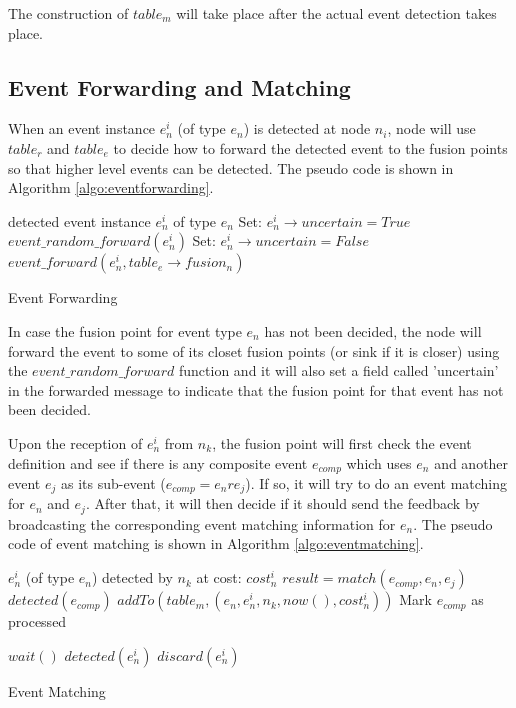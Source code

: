 The construction of \(table_m\) will take place after the actual event detection takes place. 

\subsection{Event Forwarding and Matching}
When an event instance \(e_n^i\) (of type \(e_n\)) is detected at node \(n_i\), node will use \(table_r\) and \(table_e\) to decide how to forward the detected event to the fusion points so that higher level events can be detected. The pseudo code is shown in Algorithm \ref{algo:eventforwarding}.

\begin{algorithm}
\begin{algorithmic}
\REQUIRE detected event instance \(e_n^i\) of type \(e_n\)
		\STATE Set: \(e_n^i\rightarrow uncertain=True\)
		\STATE \(event\_random\_forward(e_n^i)\)
	\ELSE
		\STATE Set: \(e_n^i\rightarrow uncertain=False\)
		\STATE \(event\_forward(e_n^i, table_e\rightarrow fusion_n)\)
	\ENDIF
\end{algorithmic}
\caption{Event Forwarding}
\label{algo:eventforwarding}
\end{algorithm}

In case the fusion point for event type \(e_n\) has not been decided, the node will forward the event to some of its closet fusion points (or sink if it is closer) using the \(event\_random\_forward\) function and it will also set a field called 'uncertain' in the forwarded message to indicate that the fusion point for that event has not been decided.

Upon the reception of \(e_n^i\) from \(n_k\), the fusion point will first check the event definition and see if there is any composite event \(e_{comp}\) which uses \(e_n\) and another event \(e_j\) as its sub-event (\(e_{comp}=e_nre_j\)). If so, it will try to do an event matching for \(e_n\) and \(e_j\). After that, it will then decide if it should send the feedback by broadcasting the corresponding event matching information for \(e_n\). The pseudo code of event matching is shown in Algorithm \ref{algo:eventmatching}.

\begin{algorithm}
\begin{algorithmic}
\REQUIRE \(e_n^i\) (of type \(e_n\)) detected by \(n_k\) at cost: \(cost_n^i\)
		\STATE \(result=match(e_{comp}, e_n, e_j)\)
			\STATE \(detected(e_{comp})\)
			\STATE \(addTo(table_m, (e_n, e_n^i, n_k, now(), cost_n^i))\)
			\STATE Mark \(e_{comp}\) as processed

		\ENDIF
	\ENDFOR
		\STATE \(wait()\)
		\STATE \(detected(e_n^i)\)
	\ELSE
		\STATE \(discard(e_n^i)\)
	\ENDIF
\end{algorithmic}
\caption{Event Matching}
\label{algo:eventmatching}
\end{algorithm}

